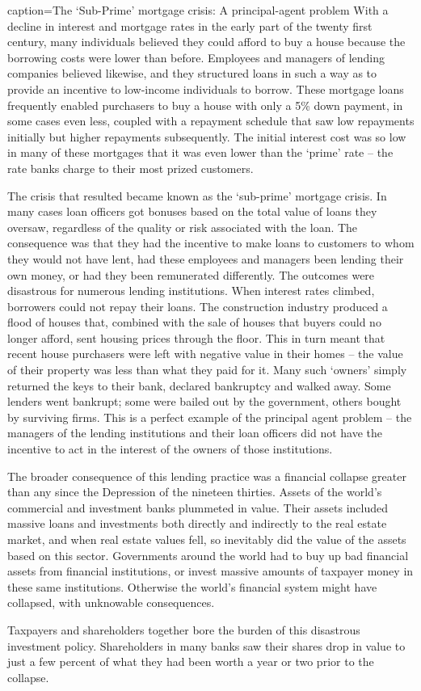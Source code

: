 \begin{ApplicationBox}{caption={The `Sub-Prime' mortgage crisis: A principal-agent problem \label{app:subprime}}}
With a decline in interest and mortgage rates in the early part of the twenty first century, many individuals believed they could afford to buy a house because the borrowing costs were lower than before. Employees and managers of lending companies believed likewise, and they structured loans in such a way as to provide an incentive to low-income individuals to borrow. These mortgage loans frequently enabled purchasers to buy a house with only a 5\% down payment, in some cases even less, coupled with a repayment schedule that saw low repayments initially but higher repayments subsequently. The initial interest cost was so low in many of these mortgages that it was even lower than the `prime' rate -- the rate banks charge to their most prized customers. 

The crisis that resulted became known as the `sub-prime' mortgage crisis. In many cases loan officers got bonuses based on the total value of loans they oversaw, regardless of the quality or risk associated with the loan. The consequence was that they had the incentive to make loans to customers to whom they would not have lent, had these employees and managers been lending their own money, or had they been remunerated differently. The outcomes were disastrous for numerous lending institutions. When interest rates climbed, borrowers could not repay their loans. The construction industry produced a flood of houses that, combined with the sale of houses that buyers could no longer afford, sent housing prices through the floor. This in turn meant that recent house purchasers were left with negative value in their homes -- the value of their property was less than what they paid for it. Many such `owners' simply returned the keys to their bank, declared bankruptcy and walked away. Some lenders went bankrupt; some were bailed out by the government, others bought by surviving firms. This is a perfect example of the principal agent problem -- the managers of the lending institutions and their loan officers did not have the incentive to act in the interest of the owners of those institutions.

The broader consequence of this lending practice was a financial collapse greater than any since the Depression of the nineteen thirties. Assets of the world's commercial and investment banks plummeted in value. Their assets included massive loans and investments both directly and indirectly to the real estate market, and when real estate values fell, so inevitably did the value of the assets based on this sector. Governments around the world had to buy up bad financial assets from financial institutions, or invest massive amounts of taxpayer money in these same institutions. Otherwise the world's financial system might have collapsed, with unknowable consequences.

Taxpayers and shareholders together bore the burden of this disastrous investment policy. Shareholders in many banks saw their shares drop in value to just a few percent of what they had been worth a year or two prior to the collapse. 
\end{ApplicationBox}

